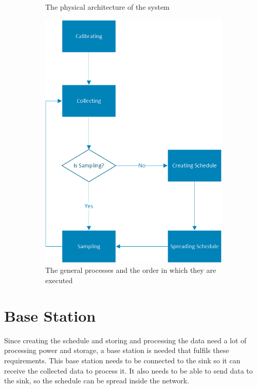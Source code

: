 \begin{figure}[htbp]
\begin{subfigure}[t]{0.4\textwidth}
   	 	\caption{The physical architecture of the system}
    	\label{fig:architecture}
    \end{subfigure}
    \quad
    \quad
    \quad
    \begin{subfigure}[t]{0.4\textwidth}
		\centering         
        \includegraphics[scale=0.7]{content/images/GeneralAproachM}
        \caption{The general processes and the order in which they are executed}
        \label{fig:processes}
    \end{subfigure}
    \caption{}
\end{figure}

\section{Base Station}
\label{chp:apr_baseStation}
Since creating the schedule and storing and processing the data need a lot of processing power and storage, a base station is needed that fulfils these requirements. This base station needs to be connected to the sink so it can receive the collected data to process it. It also needs to be able to send data to the sink, so the schedule can be spread inside the network. 
  
